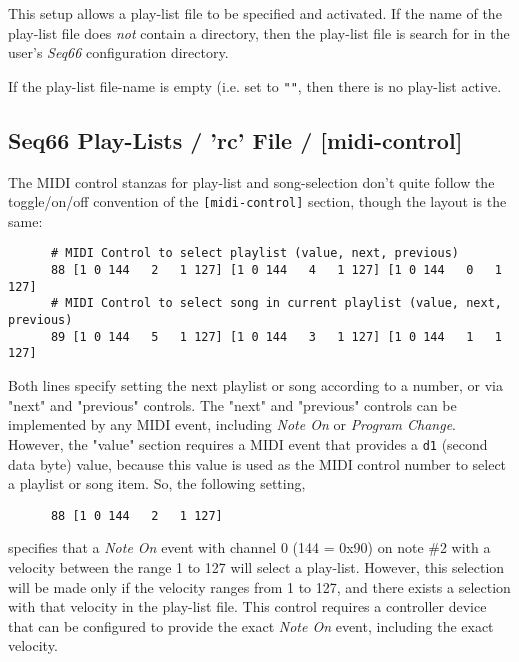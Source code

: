    This setup allows a play-list file to be specified and activated.
   If the name of the play-list file does \textsl{not} contain a directory,
   then the play-list file is search for in the user's \textsl{Seq66}
   configuration directory.

   If the play-list file-name is empty (i.e. set to \texttt{""}, then there is
   no play-list active.

\subsection{Seq66 Play-Lists / 'rc' File / [midi-control]}
\label{subsec:playlist_rc_file_midi_ctrl}

   The MIDI control stanzas for play-list and song-selection don't quite follow
   the toggle/on/off convention of the \texttt{[midi-control]} section, though
   the layout is the same:

   \begin{verbatim}
      # MIDI Control to select playlist (value, next, previous)
      88 [1 0 144   2   1 127] [1 0 144   4   1 127] [1 0 144   0   1 127]
      # MIDI Control to select song in current playlist (value, next, previous)
      89 [1 0 144   5   1 127] [1 0 144   3   1 127] [1 0 144   1   1 127]
   \end{verbatim}

   Both lines specify setting the next playlist or song according to a number,
   or via "next" and "previous" controls.  The "next" and "previous" controls
   can be implemented by any MIDI event, including \textsl{Note On} or
   \textsl{Program Change}.  However, the "value" section requires a MIDI event
   that provides a \texttt{d1} (second data byte) value, because this value is
   used as the MIDI control number to select a playlist or song item.
   So, the following setting,

   \begin{verbatim}
      88 [1 0 144   2   1 127]
   \end{verbatim}

   specifies that a \textsl{Note On} event with channel 0 (144 = 0x90) on note
   \#2 with a velocity between the range 1 to 127 will select a play-list.
   However, this selection will be made only if the velocity ranges from 1 to
   127, and there exists a selection with that velocity in the play-list file.
   This control requires a controller device that can be configured to provide
   the exact \textsl{Note On} event, including the exact velocity.

